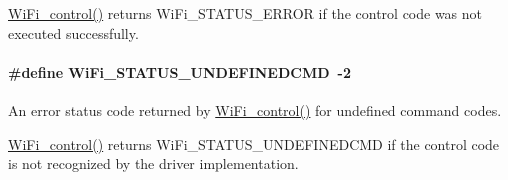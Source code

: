 \hyperlink{_wi_fi_8h_a1f42a1e174ed1682b7de43ec6f043bf7}{Wi\+Fi\+\_\+control()} returns Wi\+Fi\+\_\+\+S\+T\+A\+T\+U\+S\+\_\+\+E\+R\+R\+O\+R if the control code was not executed successfully. 
\paragraph[{Wi\+Fi\+\_\+\+S\+T\+A\+T\+U\+S\+\_\+\+U\+N\+D\+E\+F\+I\+N\+E\+D\+C\+M\+D}]{\setlength{\rightskip}{0pt plus 5cm}\#define Wi\+Fi\+\_\+\+S\+T\+A\+T\+U\+S\+\_\+\+U\+N\+D\+E\+F\+I\+N\+E\+D\+C\+M\+D~-\/2}\label{group___wi_fi___s_t_a_t_u_s_gac838b848572d4fdc52755592d2372f67}


An error status code returned by \hyperlink{_wi_fi_8h_a1f42a1e174ed1682b7de43ec6f043bf7}{Wi\+Fi\+\_\+control()} for undefined command codes. 

\hyperlink{_wi_fi_8h_a1f42a1e174ed1682b7de43ec6f043bf7}{Wi\+Fi\+\_\+control()} returns Wi\+Fi\+\_\+\+S\+T\+A\+T\+U\+S\+\_\+\+U\+N\+D\+E\+F\+I\+N\+E\+D\+C\+M\+D if the control code is not recognized by the driver implementation. 